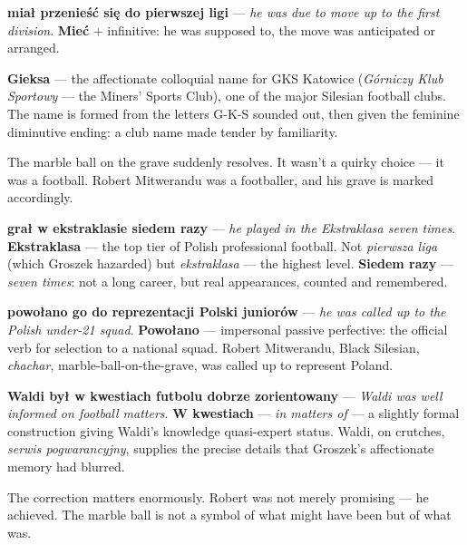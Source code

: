 \textbf{miał przenieść się do pierwszej ligi} --- \textit{he was due
to move up to the first division}. \textbf{Mieć} + infinitive: he was
supposed to, the move was anticipated or arranged.

\textbf{Gieksa} --- the affectionate colloquial name for GKS Katowice
(\textit{Górniczy Klub Sportowy} --- the Miners' Sports Club), one of
the major Silesian football clubs. The name is formed from the letters
G-K-S sounded out, then given the feminine diminutive ending: a club
name made tender by familiarity.

The marble ball on the grave suddenly resolves. It wasn't a quirky
choice --- it was a football. Robert Mitwerandu was a footballer, and
his grave is marked accordingly.



\textbf{grał w ekstraklasie siedem razy} --- \textit{he played in the
Ekstraklasa seven times}. \textbf{Ekstraklasa} --- the top tier of
Polish professional football. Not \textit{pierwsza liga} (which
Groszek hazarded) but \textit{ekstraklasa} --- the highest level.
\textbf{Siedem razy} --- \textit{seven times}: not a long career, but
real appearances, counted and remembered.

\textbf{powołano go do reprezentacji Polski juniorów} --- \textit{he
was called up to the Polish under-21 squad}. \textbf{Powołano} ---
impersonal passive perfective: the official verb for selection to a
national squad. Robert Mitwerandu, Black Silesian, \textit{chachar},
marble-ball-on-the-grave, was called up to represent Poland.

\textbf{Waldi był w kwestiach futbolu dobrze zorientowany} ---
\textit{Waldi was well informed on football matters}. \textbf{W
kwestiach} --- \textit{in matters of} --- a slightly formal
construction giving Waldi's knowledge quasi-expert status. Waldi, on
crutches, \textit{serwis pogwarancyjny}, supplies the precise details
that Groszek's affectionate memory had blurred.

The correction matters enormously. Robert was not merely promising
--- he achieved. The marble ball is not a symbol of what might have
been but of what was.


